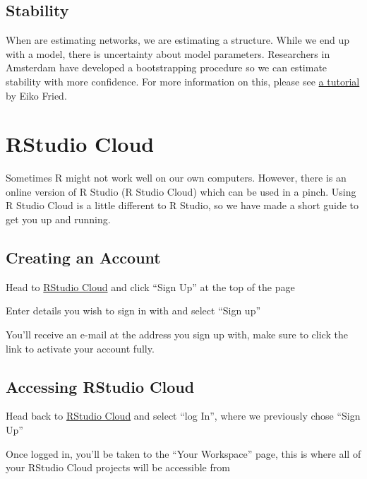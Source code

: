 \documentclass[]{book}
\begin{document}
\hypertarget{stability}{%
\section{Stability}\label{stability}}

When are estimating networks, we are estimating a structure. While we end up with a model, there is uncertainty about model parameters. Researchers in Amsterdam have developed a bootstrapping procedure so we can estimate stability with more confidence. For more information on this, please see \href{https://psych-networks.com/r-tutorial-power-issues-robustness-network-models/}{a tutorial} by Eiko Fried.

\hypertarget{appendix-appendices}{%
\appendix}


\hypertarget{rstudio-cloud}{%
\chapter{RStudio Cloud}\label{rstudio-cloud}}

Sometimes R might not work well on our own computers. However, there is an online version of R Studio (R Studio Cloud) which can be used in a pinch. Using R Studio Cloud is a little different to R Studio, so we have made a short guide to get you up and running.

\hypertarget{creating-an-account}{%
\section{Creating an Account}\label{creating-an-account}}

Head to \href{https://rstudio.cloud/}{RStudio Cloud} and click ``Sign Up'' at the top of the page

Enter details you wish to sign in with and select ``Sign up''

You'll receive an e-mail at the address you sign up with, make sure to click the link to activate your account fully.

\hypertarget{accessing-rstudio-cloud}{%
\section{Accessing RStudio Cloud}\label{accessing-rstudio-cloud}}

Head back to \href{https://rstudio.cloud/}{RStudio Cloud} and select ``log In'', where we previously chose ``Sign Up''

Once logged in, you'll be taken to the ``Your Workspace'' page, this is where all of your RStudio Cloud projects will be accessible from
\end{document}
